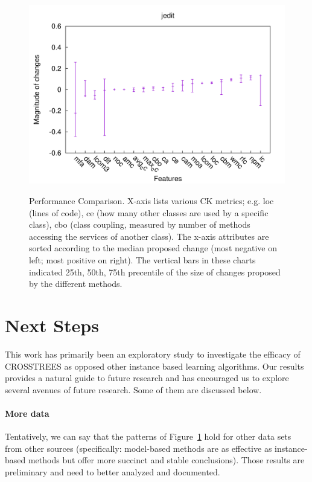 \documentclass[conference]{IEEEtran}
\newcommand{\fig}[1]{Figure~\ref{fig:#1}}
\begin{document}
\begin{figure}[t!]
\begin{minipage}{.5\linewidth}
{				\includegraphics[width=.85\linewidth]{jedit2.png}}
	 
		\end{minipage}
		\caption{Performance Comparison.
		X-axis lists various CK metrics; e.g.  loc (lines of code),
		ce (how many other classes are used by a specific class),
		cbo (class coupling, measured by number of methods accessing
		the services of another class).  The x-axis attributes  
		are sorted according to the median
		proposed change  (most negative on left; most positive on right). The vertical bars in these charts indicated 25th, 50th, 75th precentile of the size of changes proposed by the different methods.}
		\label{fig:deltas}
	\end{figure}

	
	

 \section{Next Steps}

This work has primarily been an exploratory study to investigate the efficacy of CROSSTREES as opposed other instance based learning algorithms. Our results provides a natural guide to future research and has encouraged us to explore several avenues of future research. Some of them are discussed below.

\paragraph{More data}
Tentatively, we can say that the patterns of \fig{deltas} hold for other data sets from other sources (specifically: model-based methods are as effective as instance-based methods but offer more succinct and stable conclusions). Those results are preliminary and need to better analyzed and documented.
\end{document}
